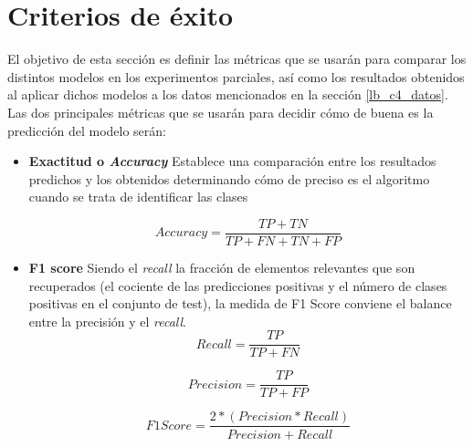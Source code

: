 \documentclass[11pt,a4paper,spanish]{book}
\begin{document}
	
	\section{Criterios de éxito}
	El objetivo de esta sección es definir las métricas que se usarán para comparar los distintos modelos en los experimentos parciales, así como los resultados obtenidos al aplicar dichos modelos a los datos mencionados en la sección \ref{lb_c4_datos}.\\
	Las dos principales métricas que se usarán para decidir cómo de buena es la predicción del modelo serán:
	\begin{itemize}
		\item \textbf{Exactitud o \emph{Accuracy} } Establece una comparación entre los resultados predichos y los obtenidos determinando cómo de preciso es el algoritmo cuando se trata de identificar las clases
		
			\[
				Accuracy = \frac{TP + TN}{ TP + FN + TN + FP} 
			\]
 			\hfill \break

		\item \textbf{F1 score} Siendo el \emph{recall} la fracción de elementos relevantes que son recuperados (el cociente de las predicciones positivas y el número de clases positivas en el conjunto de test), la medida de F1 Score conviene el balance entre la precisión y el \emph{recall}.
		\[
			Recall = \frac{TP}{ TP + FN} 
		\]
		
		\[
			Precision = \frac{TP}{TP + FP}
		\]
		
		\[
			F1 Score = \frac{2 * (Precision * Recall)}{Precision + Recall}
		\]
		\hfill \break

	
	\end{itemize}
\end{document}
